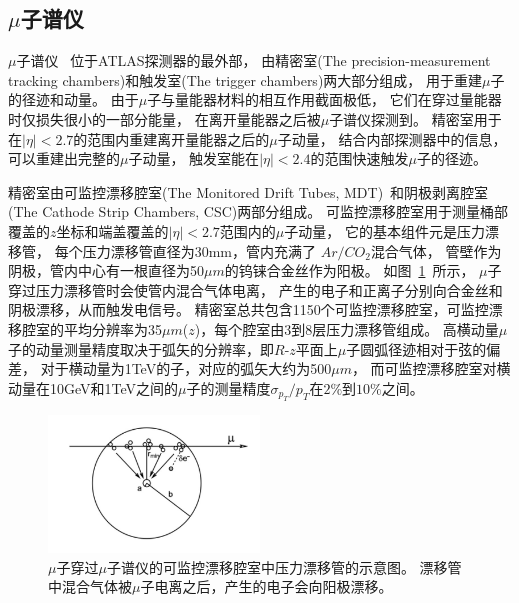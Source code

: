 \subsection{$\mu$子谱仪}
\label{sec:ATLASMSP}

$\mu$子谱仪
~\cite{ATLASMUSPEC}位于ATLAS探测器的最外部，
由精密室(The precision-measurement tracking chambers)和触发室(The trigger chambers)两大部分组成，
用于重建$\mu$子的径迹和动量。
由于$\mu$子与量能器材料的相互作用截面极低，
它们在穿过量能器时仅损失很小的一部分能量，
在离开量能器之后被$\mu$子谱仪探测到。
精密室用于在$|\eta|<2.7$的范围内重建离开量能器之后的$\mu$子动量，
结合内部探测器中的信息，可以重建出完整的$\mu$子动量，
触发室能在$|\eta|<2.4$的范围快速触发$\mu$子的径迹。

精密室由可监控漂移腔室(The Monitored Drift Tubes, MDT)~\cite{ATLASMDT}和阴极剥离腔室(The Cathode Strip Chambers, CSC)两部分组成。
可监控漂移腔室用于测量桶部覆盖的$z$坐标和端盖覆盖的$|\eta|<2.7$范围内的$\mu$子动量，
它的基本组件元是压力漂移管，
每个压力漂移管直径为30mm，管内充满了
$Ar/CO_2$混合气体，
管壁作为阴极，管内中心有一根直径为50$\mu m$的钨铼合金丝作为阳极。
如图~\ref{fig:ATLASMS1}~所示，
$\mu$子穿过压力漂移管时会使管内混合气体电离，
产生的电子和正离子分别向合金丝和阴极漂移，从而触发电信号。
精密室总共包含1150个可监控漂移腔室，可监控漂移腔室的平均分辨率为35$\mu m$($z$)，每个腔室由3到8层压力漂移管组成。
高横动量$\mu$子的动量测量精度取决于弧矢的分辨率，即$R$-$z$平面上$\mu$子圆弧径迹相对于弦的偏差，
对于横动量为1TeV的子，对应的弧矢大约为500$\mu m$，
而可监控漂移腔室对横动量在10GeV和1TeV之间的$\mu$子的测量精度$\sigma_{p_{T}}/p_{T}$在$2\%$到$10\%$之间。

\begin{figure}
  \begin{center}
    \includegraphics[width=0.5\textwidth]{figuresEXP/ATLASMS1.jpg}
  \end{center}
  \caption{
  $\mu$子穿过$\mu$子谱仪的可监控漂移腔室中压力漂移管的示意图。
漂移管中混合气体被$\mu$子电离之后，产生的电子会向阳极漂移。
  }
    \label{fig:ATLASMS1}
\end{figure}

